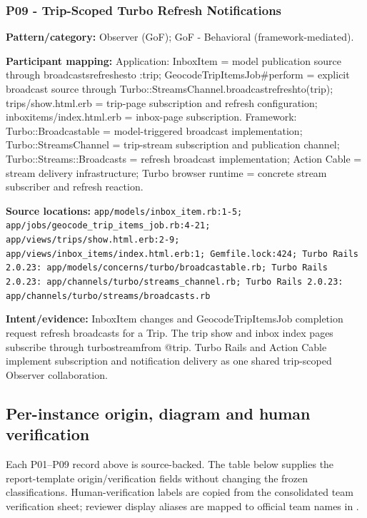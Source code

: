 \documentclass[11pt,a4paper]{article}
\renewcommand{\_}{\textunderscore\allowbreak}
\begin{document}
\subsubsection*{P09 - Trip-Scoped Turbo Refresh Notifications}
\textbf{Pattern/category:} Observer (GoF); GoF - Behavioral (framework-mediated).\par
\textbf{Participant mapping:} Application: InboxItem = model publication source through broadcasts\_refreshes\_to :trip; GeocodeTripItemsJob\#perform = explicit broadcast source through Turbo::StreamsChannel.broadcast\_refresh\_to(trip); trips/show.html.erb = trip-page subscription and refresh configuration; inbox\_items/index.html.erb = inbox-page subscription. Framework: Turbo::Broadcastable = model-triggered broadcast implementation; Turbo::StreamsChannel = trip-stream subscription and publication channel; Turbo::Streams::Broadcasts = refresh broadcast implementation; Action Cable = stream delivery infrastructure; Turbo browser runtime = concrete stream subscriber and refresh reaction.\par
\textbf{Source locations:} \nolinkurl{app/models/inbox_item.rb:1-5; app/jobs/geocode_trip_items_job.rb:4-21; app/views/trips/show.html.erb:2-9; app/views/inbox_items/index.html.erb:1; Gemfile.lock:424; Turbo Rails 2.0.23: app/models/concerns/turbo/broadcastable.rb; Turbo Rails 2.0.23: app/channels/turbo/streams_channel.rb; Turbo Rails 2.0.23: app/channels/turbo/streams/broadcasts.rb}\par
\textbf{Intent/evidence:} InboxItem changes and GeocodeTripItemsJob completion request refresh broadcasts for a Trip. The trip show and inbox index pages subscribe through turbo\_stream\_from @trip. Turbo Rails and Action Cable implement subscription and notification delivery as one shared trip-scoped Observer collaboration.\par

\subsection{Per-instance origin, diagram and human verification}
Each P01--P09 record above is source-backed. The table below supplies the report-template origin/verification fields without changing the frozen classifications. Human-verification labels are copied from the consolidated team verification sheet; reviewer display aliases are mapped to official team names in .
\end{document}
